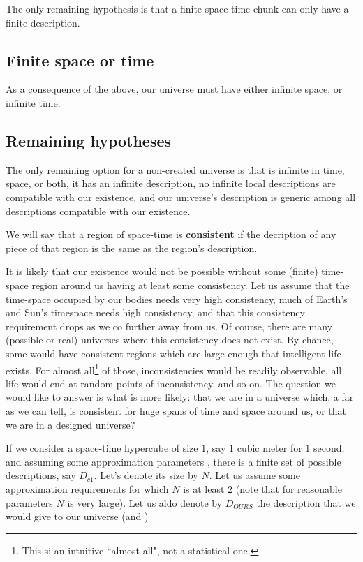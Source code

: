 \documentclass[a4paper
,draft
]{article}
\newcommand{\svn}[2][]{\todo[author=Virgil,color=red!25!white,#1]{#2}}
\newcommand{\definitie}[1]{\textbf{#1}}
\newcommand{\ghilimele}[1]{``#1"}
\begin{document}
The only remaining hypothesis is that a finite space-time chunk can only have a finite description.

\subsection{Finite space or time}

As a consequence of the above, our universe must have either infinite space, or infinite time.

\subsection{Remaining hypotheses}

The only remaining option for a non-created universe is that is infinite in time, space, or both, it has an infinite description, no infinite local descriptions are compatible with our existence, and our universe's description is generic among all descriptions compatible with our existence.

We will say that a region of space-time is \definitie{consistent} if the decription of any piece of that region is the same as the region's description.

It is likely that our existence would not be possible without some (finite) time-space region around us having at least some consistency. Let us assume that the time-space occupied by our bodies needs very high consistency, much of Earth's and Sun's timespace needs high consistency, and that this consistency requirement drops as we co further away from us. Of course, there are many (possible or real) universes where this consistency does not exist. By chance, some would have consistent regions which are large enough that intelligent life exists. For almost all\footnote{This si an intuitive \ghilimele{almost all}, not a statistical one.} of those, inconsistencies would be readily observable, all life would end at random points of inconsistency, and so on. The question we would like to answer is what is more likely: that we are in a universe which, a far as we can tell, is consistent for huge spans of time and space around us, or that we are in a designed universe?

If we consider a space-time hypercube of size $1$, say $1$ cubic meter for $1$ second, and assuming some approximation parameters \svn{define these before this section}, there is a finite set of possible descriptions, say $D_{c1}$. Let's denote its size by $N$. Let us assume some approximation requirements for which $N$ is at least $2$ (note that for reasonable parameters $N$ is very large). Let us aldo denote by $D_{OURS}$ the description that we would give to our universe (and )
\end{document}
